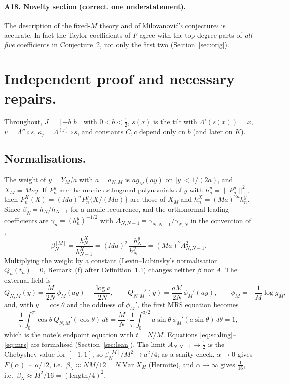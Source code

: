 \documentclass[11pt,a4paper]{article}
\theoremstyle{remark}
\numberwithin{equation}{section}
\begin{document}
\paragraph{A18. Novelty section (correct, one understatement).} The description of the
fixed-$M$ theory and of Milovanovi\'c's conjectures is accurate. In fact the Taylor
coefficients of $F$ agree with the top-degree parts of \emph{all five} coefficients in
Conjecture~2, not only the first two (Section~\ref{sec:orig}).

\section{Independent proof and necessary repairs.}\label{sec:proof}

Throughout, $J=[-b,b]$ with $0<b<\frac12$, $s(x)$ is the tilt with $\Lambda'(s(x))=x$,
$v=\Lambda''\circ s$, $\kappa_j=\Lambda^{(j)}\circ s$, and constants $C,c$ depend only on $b$
(and later on $K$).

\subsection{Normalisations.}\label{sec:norm}

The weight of $y=Y_M/a$ with $a=a_{N,M}$ is $ag_M(ay)$ on $|y|<1/(2a)$, and $X_M=May$. If
$P_n^{y}$ are the monic orthogonal polynomials of $y$ with $h_n^{y}=\|P_n^{y}\|^2$, then
$P_n^{X}(X)=(Ma)^nP_n^{y}\{X/(Ma)\}$ are those of $X_M$ and $h_n^{X}=(Ma)^{2n}h_n^{y}$. Since
$\beta_N=h_N/h_{N-1}$ for a monic recurrence, and the orthonormal leading coefficients are
$\gamma_n=(h_n^{y})^{-1/2}$ with $A_{N,N-1}=\gamma_{N,N-1}/\gamma_{N,N}$ in the convention of
\cite[p.~124 and p.~138]{levinlubinsky2018},
\begin{equation}\label{eq:scaling}
 \beta_N^{[M]}=\frac{h_N^{X}}{h_{N-1}^{X}}=(Ma)^2\,\frac{h_N^{y}}{h_{N-1}^{y}}
 =(Ma)^2A_{N,N-1}^2 .
\end{equation}
Multiplying the weight by a constant (Levin--Lubinsky's normalisation $Q_n(t_n)=0$,
Remark~(f) after Definition~1.1) changes neither $\beta$ nor $A$. The external field is
\begin{equation}\label{eq:Q}
 Q_{N,M}(y)=\frac{M}{2N}\,\phi_M(ay)-\frac{\log a}{2N},\qquad
 Q_{N,M}'(y)=\frac{aM}{2N}\,\phi_M'(ay),\qquad \phi_M=-\frac1M\log g_M ,
\end{equation}
and, with $y=\cos\theta$ and the oddness of $\phi_M'$, the first MRS equation becomes
\begin{equation}\label{eq:mrs}
 \frac1\pi\int_0^\pi\cos\theta\,Q_{N,M}'(\cos\theta)\,d\theta
 =\frac MN\cdot\frac1\pi\int_0^{\pi/2}a\sin\theta\,\phi_M'(a\sin\theta)\,d\theta=1 ,
\end{equation}
which is the note's endpoint equation with $t=N/M$. Equations
\eqref{eq:scaling}--\eqref{eq:mrs} are formalised (Section~\ref{sec:lean}). The limit
$A_{N,N-1}\to\frac12$ is the Chebyshev value for $[-1,1]$, so
$\beta_N^{[M]}/M^2\to a^2/4$; as a sanity check, $\alpha\to0$ gives $F(\alpha)\sim\alpha/12$,
i.e.\ $\beta_N\approx NM/12=N\operatorname{Var}X_M$ (Hermite), and $\alpha\to\infty$ gives
$\frac1{16}$, i.e.\ $\beta_N\approx M^2/16=(\text{length}/4)^2$.
\end{document}
